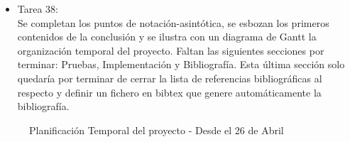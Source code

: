 \begin{itemize}
\item Tarea 38:\\
Se completan los puntos de notación-asintótica, se esbozan los primeros contenidos de la conclusión y se ilustra con un diagrama de Gantt la organización temporal del proyecto. Faltan las siguientes secciones por terminar: Pruebas, Implementación y Bibliografía. Esta última sección solo quedaría por terminar de cerrar la lista de referencias bibliográficas al respecto y definir un fichero en bibtex que genere automáticamente la bibliografía.\\

\end{itemize}
\vfill
\pagebreak
\begin{figure}[H]
\caption{Planificación Temporal del proyecto - Desde el 26 de Abril}
\end{figure}

